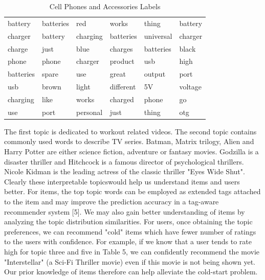 \documentclass[10pt,conference]{IEEEtran}
\begin{document}
\begin{table}[h]
\centering
\caption{Cell Phones and Accessories Labels}
\label{Cell Phones and Accessories Labels}
\begin{tabular}{ llllll }
\midrule
battery & batteries & red   & works  & thing & battery \\
charger & battery & charging & batteries & universal & charger \\
charge & just & blue & charges & batteries & black \\ 
phone & phone & charger & product & usb & high\\ 
batteries & spare & use  & great & output & port \\ 
usb & brown & light & different & 5V & voltage \\ 
charging & like & works & charged & phone & go\\ 
use & port & personal & just & thing & otg \\ 
\bottomrule          
\end{tabular}
\end{table}

The first topic is dedicated to workout related videos. The second topic contains commonly used words to describe TV series. Batman, Matrix trilogy, Alien and Harry Potter are either science fiction, adventure or fantasy movies. Godzilla is a disaster thriller and Hitchcock is a famous director of psychological thrillers. Nicole Kidman is the leading actress of the classic thriller "Eyes Wide Shut". Clearly these interpretable topicswould help us understand items and users better. For items, the top topic words can be employed as extended tags attached to the item and may improve the prediction accuracy in a tag-aware recommender system [5]. We may also gain better understanding of items by analyzing the topic distribution similarities. For users, once obtaining the topic preferences, we can recommend "cold" items which have fewer number of ratings to the users with confidence. For example, if we know that a user tends to rate high for topic three and five in Table 5, we can confidently recommend the movie "Interstellar" (a Sci-Fi Thriller movie) even if this movie is not being shown yet. Our prior knowledge of items therefore can help alleviate the cold-start problem.



\end{document}
